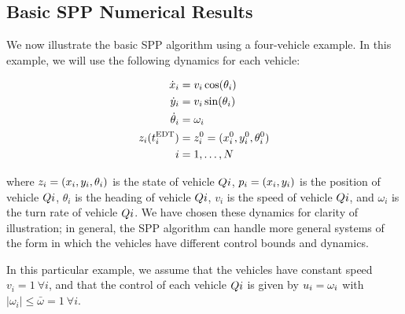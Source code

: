 \subsection{Basic SPP Numerical Results \label{sec:basic_results}}

We now illustrate the basic SPP algorithm using a four-vehicle example. In this example, we will use the following dynamics for each vehicle:

\begin{equation}
\begin{aligned}
\dot x_i &= v_i \cos(\theta_i) \\
\dot y_i &= v_i \sin(\theta_i) \\
\dot \theta_i &= \omega_i \\
z_i(t^\text{EDT}_i) &= z_i^0 = (x_i^0, y_i^0, \theta_i^0) \\
i &= 1, \ldots, N
\end{aligned}
\end{equation}

\noindent where $z_i = (x_i, y_i, \theta_i)$ is the state of vehicle $Q{i}$, $p_i = (x_i, y_i)$ is the position of vehicle $Q{i}$, $\theta_i$ is the heading of vehicle $Q{i}$, $v_i$ is the speed of vehicle $Q{i}$, and $\omega_i$ is the turn rate of vehicle $Q{i}$. We have chosen these dynamics for clarity of illustration; in general, the SPP algorithm can handle more general systems of the form in which the vehicles have different control bounds and dynamics. 

In this particular example, we assume that the vehicles have constant speed $v_i = 1 ~ \forall i$, and that the control of each vehicle $Q{i}$ is given by $u_i = \omega_i$ with $|\omega_i| \le \bar\omega = 1 ~ \forall i$. 

